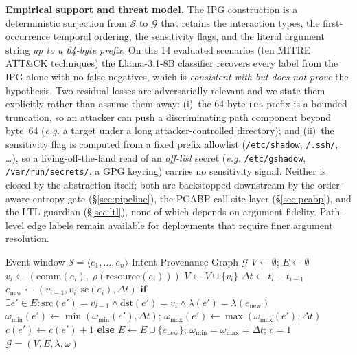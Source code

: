 \documentclass[journal]{IEEEtran}
\newcommand{\eg}{\textit{e.g.}}
\begin{document}
\noindent\textbf{Empirical support and threat model.}
The IPG construction is a deterministic surjection from $\mathcal{S}$ to
$\mathcal{G}$ that retains the interaction types, the first-occurrence
temporal ordering, the sensitivity flags, and the literal argument string
\emph{up to a 64-byte prefix}.  On the 14 evaluated scenarios (ten MITRE
ATT\&CK techniques) the Llama-3.1-8B classifier recovers every label from the
IPG alone with no false negatives, which is \emph{consistent with but does
not prove} the hypothesis.  Two residual losses are adversarially relevant
and we state them explicitly rather than assume them away:
(i)~the 64-byte \texttt{res} prefix is a bounded truncation, so an attacker
can push a discriminating path component beyond byte~64 (\eg{} a target under
a long attacker-controlled directory); and
(ii)~the sensitivity flag is computed from a fixed prefix allowlist
(\texttt{/etc/shadow}, \texttt{/.ssh/}, \dots), so a living-off-the-land read
of an \emph{off-list} secret (\eg{} \texttt{/etc/gshadow},
\texttt{/var/run/secrets/}, a GPG keyring) carries no sensitivity signal.
Neither is closed by the abstraction itself; both are backstopped downstream
by the order-aware entropy gate (\S\ref{sec:pipeline}), the PCABP call-site
layer (\S\ref{sec:pcabp}), and the LTL guardian (\S\ref{sec:ltl}), none of
which depends on argument fidelity.  Path-level edge labels remain available
for deployments that require finer argument resolution.

\begin{algorithm}[!t]
\caption{IPG Construction}\label{alg:ipg}
\footnotesize
\begin{algorithmic}[1]
\Require Event window $\mathcal{S} = \langle e_1, \ldots, e_n \rangle$
\Ensure Intent Provenance Graph $\mathcal{G}$
\State $V \gets \emptyset$;\; $E \gets \emptyset$
  \State $v_i \gets (\text{comm}(e_i),\; \rho(\text{resource}(e_i)))$
   $V \gets V \cup \{v_i\}$ \EndIf
    \State $\Delta t \gets t_i - t_{i-1}$
    \State $e_{\text{new}} \gets (v_{i-1}, v_i, \text{sc}(e_i), \Delta t)$
    \State\label{alg:dedup} \textbf{if} $\exists e' \in E : \text{src}(e')=v_{i-1} \wedge \text{dst}(e')=v_i
           \wedge \lambda(e')=\lambda(e_{\text{new}})$
    \State \quad $\omega_{\min}(e') \gets \min(\omega_{\min}(e'), \Delta t)$;\;
                  $\omega_{\max}(e') \gets \max(\omega_{\max}(e'), \Delta t)$
    \State \quad $c(e') \gets c(e') + 1$ 
    \State \textbf{else} $E \gets E \cup \{e_{\text{new}}\}$;\;
           $\omega_{\min}{=}\omega_{\max}{=}\Delta t$;\; $c{=}1$
  \EndIf
\EndFor
\State \Return $\mathcal{G} = (V, E, \lambda, \omega)$
\end{algorithmic}
\end{algorithm}
\end{document}
